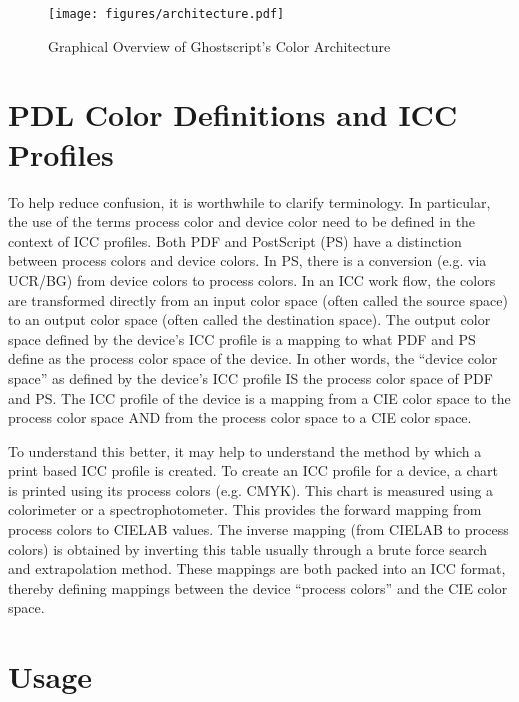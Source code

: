 \documentclass[12pt,notitlepage]{article}
\begin{document}
\begin{figure}
    \begin{center}
\texttt{[image: figures/architecture.pdf]}
    \end{center}
   \caption{Graphical Overview of Ghostscript's Color Architecture}
    \label{fig:ICC_ARCH}
\end{figure}

\section{PDL Color Definitions and ICC Profiles}

To help reduce confusion, it is worthwhile to clarify terminology. In particular, the use of the terms process color and device color need to be defined in the context of ICC profiles. Both PDF\cite{PDF} and PostScript (PS) have a distinction between process colors and device colors.  In PS, there is
a conversion (e.g. via UCR/BG) from device colors to process colors.  In an ICC work flow, the colors are transformed directly from an input color space (often called the source space) to an output color space (often called the destination space).  The output color space defined by the device's ICC profile is a mapping to what PDF and PS define as the process color space of the device.  In other words, the ``device color space'' as defined by the device's ICC profile IS the process color space of PDF and PS.  The ICC profile of the device is a mapping from a CIE color space to the process color space AND from the process color space to a CIE color space.

To understand this better, it may help to understand the method by which a print based ICC profile is created.  To create an ICC profile for a device, a chart is printed using its process colors (e.g. CMYK).  This chart is measured using a colorimeter or a spectrophotometer.  This provides the forward mapping from process colors to CIELAB values.  The inverse mapping (from CIELAB to process colors) is obtained by inverting this table usually through a brute force search and extrapolation method.  These mappings are both packed into an ICC format, thereby defining mappings between the device ``process colors'' and the CIE color space.

\section{Usage}
\end{document}
